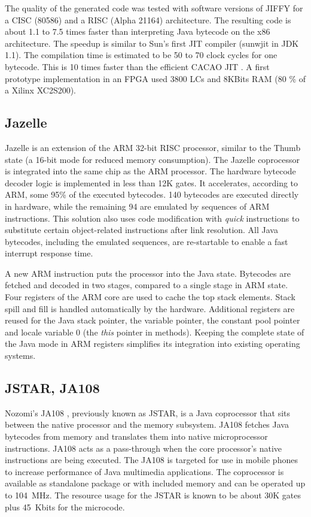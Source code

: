 The quality of the generated code was tested with software versions
of JIFFY for a CISC (80586) and a RISC (Alpha 21164) architecture.
The resulting code is about 1.1 to 7.5 times faster than interpreting
Java bytecode on the x86 architecture. The speedup is similar to
Sun's first JIT compiler (sunwjit in JDK 1.1). The compilation time
is estimated to be 50 to 70 clock cycles for one bytecode. This is 10
times faster than the efficient CACAO JIT \cite{Krall98}. A first
prototype implementation in an FPGA used 3800 LCs and 8KBits RAM (80
\% of a Xilinx XC2S200).


\subsection{Jazelle}

Jazelle \cite{Jazelle} is an extension of the ARM 32-bit RISC
processor, similar to the Thumb state (a 16-bit mode for reduced
memory consumption). The Jazelle coprocessor is integrated into the
same chip as the ARM processor. The hardware bytecode decoder logic
is implemented in less than 12K gates. It accelerates, according to
ARM, some 95\% of the executed bytecodes. 140 bytecodes are executed
directly in hardware, while the remaining 94 are emulated by
sequences of ARM instructions. This solution also uses code
modification with \textit{quick} instructions to substitute certain
object-related instructions after link resolution. All Java
bytecodes, including the emulated sequences, are re-startable to
enable a fast interrupt response time.


A new ARM instruction puts the processor into the Java state.
Bytecodes are fetched and decoded in two stages, compared to a single
stage in ARM state. Four registers of the ARM core are used to cache
the top stack elements. Stack spill and fill is handled automatically
by the hardware. Additional registers are reused for the Java stack
pointer, the variable pointer, the constant pool pointer and locale
variable 0 (the \textit{this} pointer in methods). Keeping the
complete state of the Java mode in ARM registers simplifies its
integration into existing operating systems.

\subsection{JSTAR, JA108}

Nozomi's JA108 \cite{JSTAR}, previously known as JSTAR, is a Java
coprocessor that sits between the native processor and the memory
subsystem. JA108 fetches Java bytecodes from memory and translates
them into native microprocessor instructions. JA108 acts as a
pass-through when the core processor's native instructions are being
executed. The JA108 is targeted for use in mobile phones to increase
performance of Java multimedia applications. The coprocessor is
available as standalone package or with included memory and can be
operated up to 104~MHz. The resource usage for the JSTAR is known to
be about 30K gates plus 45~Kbits for the microcode.

